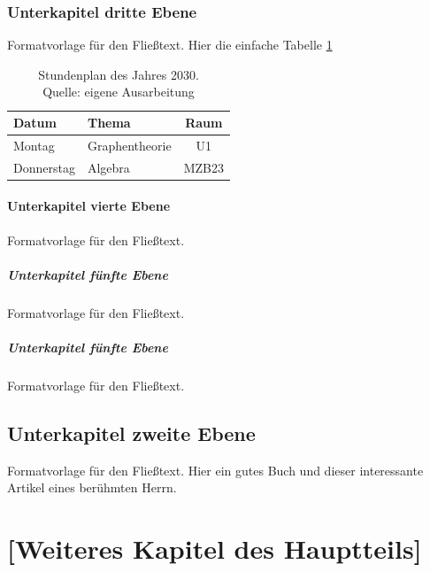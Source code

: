 \subsection{Unterkapitel dritte Ebene}
Formatvorlage für den Fließtext. Hier die einfache Tabelle \ref{tab:sp}

\begin{table}[htb]
  \centering
  \begin{tabular}{ | l | l |c|}
    \hline
    Datum      & Thema           & Raum \\
    \hline\hline
    Montag     & Graphentheorie  & U1   \\
    \hline
    Donnerstag & Algebra         & MZB23\\
    \hline
  \end{tabular}
  \caption[Stundenplan]{Stundenplan des Jahres 2030.\\ Quelle: eigene Ausarbeitung}
  \label{tab:sp}
\end{table}

\subsubsection{Unterkapitel vierte Ebene}
Formatvorlage für den Fließtext.

\paragraph{Unterkapitel fünfte Ebene}\mbox{}\newline
Formatvorlage für den Fließtext.

\paragraph{Unterkapitel fünfte Ebene}\mbox{}\newline
Formatvorlage für den Fließtext.


\section{Unterkapitel zweite Ebene}
Formatvorlage für den Fließtext.
Hier ein gutes Buch \citep[vgl.][Kapitel 2]{Chvatal1983} und dieser interessante Artikel \citep{Einstein1905} eines berühmten Herrn.


\chapter{[Weiteres Kapitel des Hauptteils]}

